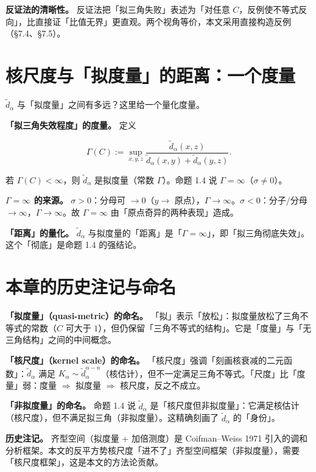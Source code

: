 \documentclass[a4paper,11pt,openany]{ctexbook}
\numberwithin{equation}{chapter}
\numberwithin{figure}{chapter}
\numberwithin{table}{chapter}
\begin{document}
\textbf{反证法的清晰性。} 反证法把「拟三角失败」表述为「对任意 $C$，反例使不等式反向」，比直接证「比值无界」更直观。两个视角等价，本文采用直接构造反例（§7.4、§7.5）。

\section{核尺度与「拟度量」的距离：一个度量}

$\widetilde d_\alpha$ 与「拟度量」之间有多远？这里给一个量化度量。

\textbf{「拟三角失效程度」的度量。} 定义

$$\Gamma(C):=\sup_{x,y,z}\frac{\widetilde d_\alpha(x,z)}{\widetilde d_\alpha(x,y)+\widetilde d_\alpha(y,z)}.$$

若 $\Gamma(C)<\infty$，则 $\widetilde d_\alpha$ 是拟度量（常数 $\Gamma$）。命题 1.4 说 $\Gamma=\infty$（$\sigma\neq0$）。

\textbf{$\Gamma=\infty$ 的来源。} $\sigma>0$：分母可 $\to0$（$y\to$ 原点），$\Gamma\to\infty$。$\sigma<0$：分子/分母 $\to\infty$，$\Gamma\to\infty$。故 $\Gamma=\infty$ 由「原点奇异的两种表现」造成。

\textbf{「距离」的量化。} $\widetilde d_\alpha$ 与拟度量的「距离」是「$\Gamma=\infty$」，即「拟三角彻底失效」。这个「彻底」是命题 1.4 的强结论。

\section{本章的历史注记与命名}

\textbf{「拟度量」（quasi-metric）的命名。} 「拟」表示「放松」：拟度量放松了三角不等式的常数（$C$ 可大于 $1$），但仍保留「三角不等式的结构」。它是「度量」与「无三角结构」之间的中间概念。

\textbf{「核尺度」（kernel scale）的命名。} 「核尺度」强调「刻画核衰减的二元函数」：$\widetilde d_\alpha$ 满足 $K_\alpha\sim\widetilde d_\alpha^{\alpha-n}$（核估计），但不一定满足三角不等式。「尺度」比「度量」弱：度量 $\Rightarrow$ 拟度量 $\Rightarrow$ 核尺度，反之不成立。

\textbf{「非拟度量」的命名。} 命题 1.4 说 $\widetilde d_\alpha$ 是「核尺度但非拟度量」：它满足核估计（核尺度），但不满足拟三角（非拟度量）。这精确刻画了 $\widetilde d_\alpha$ 的「身份」。

\textbf{历史注记。} 齐型空间（拟度量 + 加倍测度）是 Coifman–Weiss 1971 引入的调和分析框架。本文的反平方势核尺度「进不了」齐型空间框架（非拟度量），需要「核尺度框架」，这是本文的方法论贡献。
\end{document}

